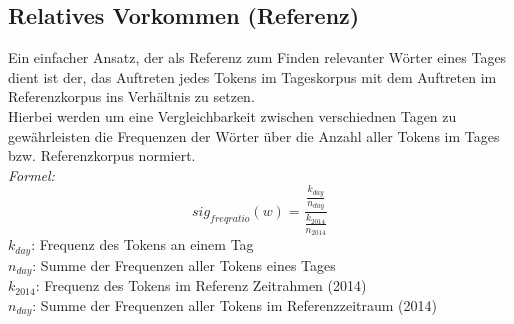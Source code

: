 \subsection{Relatives Vorkommen (Referenz)
}
Ein einfacher Ansatz, der als Referenz zum Finden relevanter Wörter eines Tages dient ist der, das Auftreten jedes Tokens im Tageskorpus mit dem Auftreten im Referenzkorpus ins Verhältnis zu setzen.\\
Hierbei werden um eine Vergleichbarkeit zwischen verschiednen Tagen zu gew\"ahrleisten die Frequenzen der W\"orter \"uber die Anzahl aller Tokens im Tages bzw. Referenzkorpus normiert.\\

	\emph{Formel: } 
	\begin{equation}
	sig_{freqratio}(w) = \frac{\frac{k_{day}}{n_{day}}}{\frac{k_{2014}}{n_{2014}}}
	\end{equation}
	$k_{day}$: Frequenz des Tokens an einem Tag\\
	$n_{day}$: Summe der Frequenzen aller Tokens eines Tages\\
	$k_{2014}$: Frequenz des Tokens im Referenz Zeitrahmen (2014)\\
	$n_{day}$: Summe der Frequenzen aller Tokens im Referenzzeitraum (2014)\\
	

